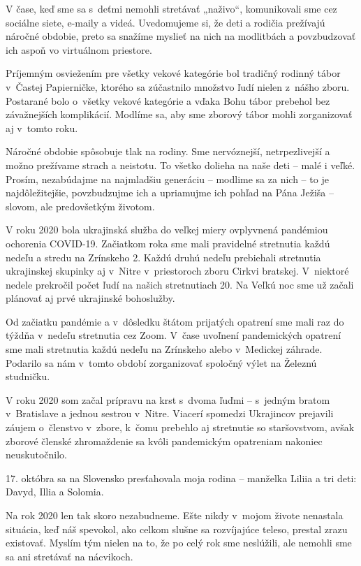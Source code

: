 V čase, keď sme sa s~deťmi nemohli stretávať „naživo“, komunikovali sme cez sociálne siete, e-maily a videá. Uvedomujeme si, že deti a rodičia prežívajú náročné obdobie, preto sa snažíme myslieť na nich na modlitbách a povzbudzovať ich aspoň vo virtuálnom priestore.

Príjemným osviežením pre všetky vekové kategórie bol tradičný rodinný tábor v~Častej Papierničke, ktorého sa zúčastnilo množstvo ľudí nielen z~nášho zboru. Postarané bolo o~všetky vekové kategórie a vďaka Bohu tábor prebehol bez závažnejších komplikácií. Modlíme sa, aby sme zborový tábor mohli zorganizovať aj v~tomto roku.

Náročné obdobie spôsobuje tlak na rodiny. Sme nervóznejší, netrpezlivejší a možno prežívame strach a neistotu. To všetko dolieha na naše deti -- malé i veľké. Prosím, nezabúdajme na najmladšiu generáciu -- modlime sa za nich -- to je najdôležitejšie, povzbudzujme ich a upriamujme ich pohľad na Pána Ježiša -- slovom, ale predovšetkým životom.



V roku 2020 bola ukrajinská služba do veľkej miery ovplyvnená pandémiou ochorenia COVID-19. Začiatkom roka sme mali pravidelné stretnutia každú nedeľu a stredu na Zrínskeho 2. Každú druhú nedeľu prebiehali stretnutia ukrajinskej skupinky aj v~Nitre v~priestoroch zboru Cirkvi bratskej. V~niektoré nedele prekročil počet ľudí na našich stretnutiach 20. Na Veľkú noc sme už začali plánovať aj prvé ukrajinské bohoslužby.

Od začiatku pandémie a v~dôsledku štátom prijatých opatrení sme mali raz do týždňa v~nedeľu stretnutia cez Zoom. V~čase uvoľnení pandemických opatrení sme mali stretnutia každú nedeľu na Zrínskeho alebo v~Medickej záhrade. Podarilo sa nám v~tomto období zorganizovať spoločný výlet na Železnú studničku.

V roku 2020 som začal prípravu na krst s~dvoma ľuďmi – s~jedným bratom v~Bratislave a jednou sestrou v~Nitre. Viacerí spomedzi Ukrajincov prejavili záujem o~členstvo v~zbore, k~čomu prebehlo aj stretnutie so staršovstvom, avšak zborové členské zhromaždenie sa kvôli pandemickým opatreniam nakoniec neuskutočnilo.

17. októbra sa na Slovensko presťahovala moja rodina -- manželka Liliia a tri deti: Davyd, Illia a Solomia.



Na rok 2020 len tak skoro nezabudneme. Ešte nikdy v~mojom živote nenastala situácia, keď náš spevokol, ako celkom slušne sa rozvíjajúce teleso, prestal zrazu existovať. Myslím tým nielen na to, že po celý rok sme neslúžili, ale nemohli sme sa ani stretávať na nácvikoch.

